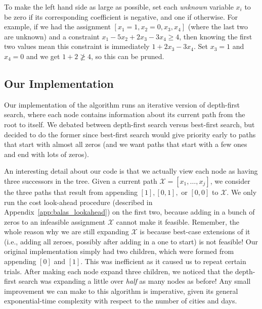 \documentclass{article}
\begin{document}
To make the left hand side as large as possible, set each \emph{unknown} variable $x_i$ to be zero if its corresponding coefficient is negative, and
one if otherwise. For example, if we had the assignment $[x_1=1, x_2=0, x_3, x_4]$ (where the last two are unknown) and a constraint $x_1 - 5x_2 +
2x_3 -3x_4 \ge 4$, then knowing the first two values mean this constraint is immediately $1 + 2x_3 - 3x_4$. Set $x_3=1$ and $x_4=0$ and we get $1+2
\not \ge 4$, so this can be pruned.

\subsection{Our Implementation}

Our implementation of the algorithm runs an iterative version of depth-first search, where each node contains information about its current path from
the root to itself. We debated between depth-first search versus best-first search, but decided to do the former since best-first search would give
priority early to paths that start with almost all zeros (and we want paths that start with a few ones and end with lots of zeros).

An interesting detail about our code is that we actually view each node as having three successors in the tree. Given a current path $\mathcal{X} =
[x_1, \ldots, x_j]$, we consider the three paths that result from appending $[1],[0,1],$ or $[0,0]$ to $\mathcal{X}$. We only run the cost look-ahead
procedure (described in Appendix~\ref{app:balas_lookahead}) on the first two, because adding in a bunch of zeros to an infeasible assignment
$\mathcal{X}$ cannot make it feasible. Remember, the whole reason why we are still expanding $\mathcal{X}$ is because best-case extensions of it
(i.e., adding all zeroes, possibly after adding in a one to start) is not feasible! Our original implementation simply had two children, which were
formed from appending $[0]$ and $[1]$. This was inefficient as it caused us to repeat certain trials. After making each node expand three children, we
noticed that the depth-first search was expanding a little over \emph{half} as many nodes as before! Any small improvement we can make to this
algorithm is imperative, given its general exponential-time complexity with respect to the number of cities and days.
\end{document}
